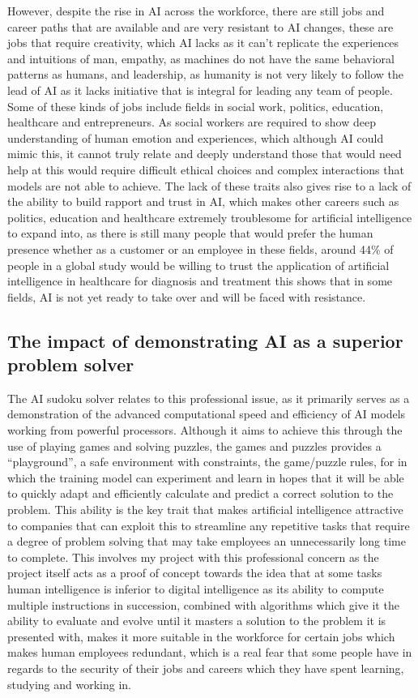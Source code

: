 \documentclass[]{final_report}
\begin{document}
However, despite the rise in AI across the workforce, there are still jobs and career paths that are available and are very resistant to AI changes, these are jobs that require creativity, which AI lacks as it can't replicate the experiences and intuitions of man, empathy, as machines do not have the same behavioral patterns as humans, and leadership, as humanity is not very likely to follow the lead of AI as it lacks initiative that is integral for leading any team of people. Some of these kinds of jobs include fields in social work, politics, education, healthcare and entrepreneurs. As social workers are required to show deep understanding of human emotion and experiences, which although AI could mimic this, it cannot truly relate and deeply understand those that would need help at this would require difficult ethical choices and complex interactions that models are not able to achieve. The lack of these traits also gives rise to a lack of the ability to build rapport and trust in AI, which makes other careers such as politics, education and healthcare extremely troublesome for artificial intelligence to expand into, as there is still many people that would prefer the human presence whether as a customer or an employee in these fields, around 44\% of people in a global study would be willing to trust the application of artificial intelligence in healthcare for diagnosis and treatment \cite{Statista2022} this shows that in some fields, AI is not yet ready to take over and will be faced with resistance.  

\subsection{The impact of demonstrating AI as a superior problem solver} 

The AI sudoku solver relates to this professional issue, as it primarily serves as a demonstration of the advanced computational speed and efficiency of AI models working from powerful processors. Although it aims to achieve this through the use of playing games and solving puzzles, the games and puzzles provides a “playground”, a safe environment with constraints, the game/puzzle rules, for in which the training model can experiment and learn in hopes that it will be able to quickly adapt and efficiently calculate and predict a correct solution to the problem. This ability is the key trait that makes artificial intelligence attractive to companies that can exploit this to streamline any repetitive tasks that require a degree of problem solving that may take employees an unnecessarily long time to complete. This involves my project with this professional concern as the project itself acts as a proof of concept towards the idea that at some tasks human intelligence is inferior to digital intelligence as its ability to compute multiple instructions in succession, combined with algorithms which give it the ability to evaluate and evolve until it masters a solution to the problem it is presented with, makes it more suitable in the workforce for certain jobs which makes human employees redundant, which is a real fear that some people have in regards to the security of their jobs and careers which they have spent learning, studying and working in. 
\end{document}
